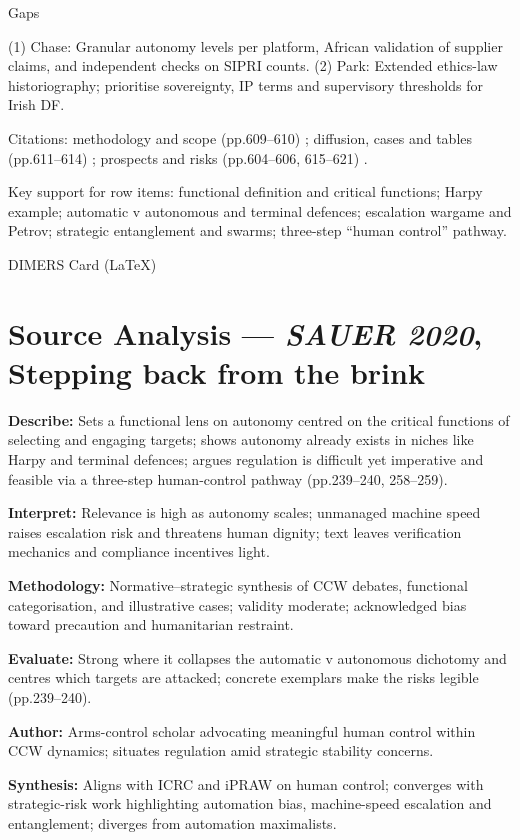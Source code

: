 Gaps

(1) Chase: Granular autonomy levels per platform, African validation of supplier claims, and independent checks on SIPRI counts.
(2) Park: Extended ethics-law historiography; prioritise sovereignty, IP terms and supervisory thresholds for Irish DF.

Citations: methodology and scope (pp.609–610) ; diffusion, cases and tables (pp.611–614) ; prospects and risks (pp.604–606, 615–621) .

\parencite{SAUER_2020}
Key support for row items: functional definition and critical functions; Harpy example; automatic v autonomous and terminal defences; escalation wargame and Petrov; strategic entanglement and swarms; three-step “human control” pathway.

DIMERS Card (LaTeX)

\section*{Source Analysis — \textit{SAUER 2020}, Stepping back from the brink}
\textbf{Describe:} Sets a functional lens on autonomy centred on the critical functions of selecting and engaging targets; shows autonomy already exists in niches like Harpy and terminal defences; argues regulation is difficult yet imperative and feasible via a three-step human-control pathway (pp.239–240, 258–259).

\textbf{Interpret:} Relevance is high as autonomy scales; unmanaged machine speed raises escalation risk and threatens human dignity; text leaves verification mechanics and compliance incentives light.

\textbf{Methodology:} Normative–strategic synthesis of CCW debates, functional categorisation, and illustrative cases; validity moderate; acknowledged bias toward precaution and humanitarian restraint.

\textbf{Evaluate:} Strong where it collapses the automatic v autonomous dichotomy and centres which targets are attacked; concrete exemplars make the risks legible (pp.239–240).

\textbf{Author:} Arms-control scholar advocating meaningful human control within CCW dynamics; situates regulation amid strategic stability concerns.

\textbf{Synthesis:} Aligns with ICRC and iPRAW on human control; converges with strategic-risk work highlighting automation bias, machine-speed escalation and entanglement; diverges from automation maximalists.

